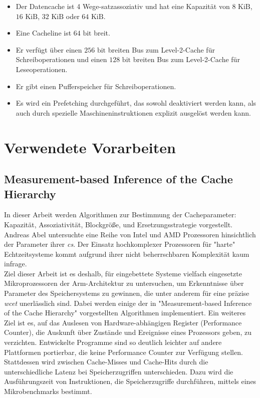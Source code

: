 \documentclass[]{scrbook}
\begin{document}
\begin{itemize} 
	\item Der Datencache ist 4 Wege-satzassoziativ und hat eine Kapazität von $8 \textrm{ KiB}$, $16 \textrm{ KiB}$, $32 \textrm{ KiB}$ oder $64 \textrm{ KiB}$.
	\item Eine Cacheline ist $64 \textrm{ bit}$ breit.
	\item Er verfügt über einen $256 \textrm{ bit}$ breiten Bus zum Level-2-Cache für Schreiboperationen und einen $128 \textrm{ bit}$ breiten Bus zum Level-2-Cache für Leseoperationen.
	\item Er gibt einen Pufferspeicher für Schreiboperationen.
	\item Es wird ein Prefetching durchgeführt, das sowohl deaktiviert werden kann, als auch durch spezielle Maschineninstruktionen explizit ausgelöst werden kann.
\end{itemize}



\section{Verwendete Vorarbeiten}
\subsection{Measurement-based Inference of the Cache Hierarchy}

In dieser Arbeit werden Algorithmen zur Bestimmung der Cacheparameter:
Kapazität, 
Assoziativität,
Blockgröße,
und Ersetzungsstrategie 
vorgestellt.
\\
Andreas Abel untersuchte eine Reihe von Intel und AMD Prozessoren hinsichtlich der Parameter ihrer \textsl{\glspl{c}}.
Der Einsatz hochkomplexer Prozessoren für "harte" Echtzeitsysteme kommt aufgrund ihrer nicht beherrschbaren Komplexität kaum infrage.
\\
Ziel dieser Arbeit ist es deshalb, für eingebettete Systeme vielfach eingesetzte Mikroprozessoren der Arm-Architektur zu untersuchen, um Erkenntnisse über Parameter des Speichersystems zu gewinnen, die unter anderem für eine präzise \textsl{\gls{wcet}} unerlässlich sind.
Dabei werden einige der in "Measurement-based Inference of the Cache Hierarchy" vorgestellten Algorithmen implementiert.
Ein weiteres Ziel ist es, auf das Auslesen von Hardware-abhängigen Register (Performance Counter), die Auskunft über Zustände und Ereignisse eines Prozessors geben, zu verzichten.
Entwickelte Programme sind so deutlich leichter auf andere Plattformen portierbar, die keine Performance Counter zur Verfügung stellen.
\\
Stattdessen wird zwischen Cache-Misses und Cache-Hits durch die unterschiedliche Latenz bei Speicherzugriffen unterschieden.
Dazu wird die Ausführungszeit von Instruktionen, die Speicherzugriffe durchführen, mittels eines Mikrobenchmarks bestimmt. 
\end{document}
